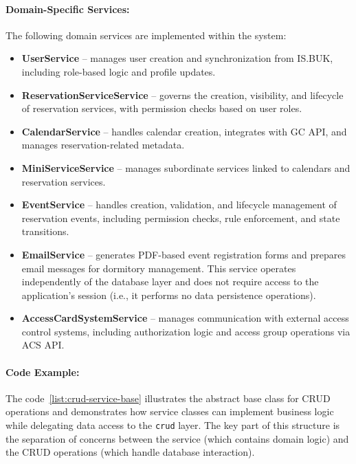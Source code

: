 \paragraph{Domain-Specific Services:}
The following domain services are implemented within the system:
\begin{itemize}
  \item \textbf{UserService} – manages user creation and synchronization from IS.BUK, including role-based logic and profile updates.
  \item \textbf{ReservationServiceService} – governs the creation, visibility, and lifecycle of reservation services, with permission checks based on user roles.
  \item \textbf{CalendarService} – handles calendar creation, integrates with GC API, and manages reservation-related metadata.
  \item \textbf{MiniServiceService} – manages subordinate services linked to calendars and reservation services.
  \item \textbf{EventService} – handles creation, validation, and lifecycle management of reservation events, including permission checks, rule enforcement, and state transitions.
  \item \textbf{EmailService} – generates PDF-based event registration forms and prepares email messages for dormitory management. This service operates independently of the database layer and does not require access to the application’s session (i.e., it performs no data persistence operations).
  \item \textbf{AccessCardSystemService} – manages communication with external access control systems, including authorization logic and access group operations via ACS API.
\end{itemize}

\paragraph{Code Example:}
The code~\ref{list:crud-service-base} illustrates the abstract base class for CRUD operations and demonstrates how service classes can implement business logic while delegating data access to the \texttt{crud} layer. The key part of this structure is the separation of concerns between the service (which contains domain logic) and the CRUD operations (which handle database interaction).

